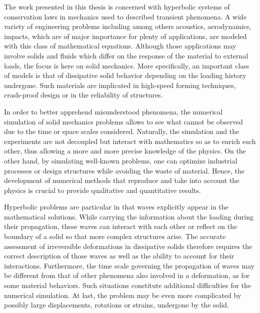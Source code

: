 The work presented in this thesis is concerned with hyperbolic systems of conservation laws in mechanics used to described transient phenomena.
A wide variety of engineering problems including among others acoustics, aerodynamics, impacts, which are of major importance for plenty of applications, are modeled with this class of mathematical equations. 
Although those applications may involve solids and fluids which differ on the response of the material to external loads, the focus is here on solid mechanics.
More specifically, an important class of models is that of dissipative solid behavior depending on the loading history undergone.
Such materials are implicated in high-speed forming techniques, crash-proof design or in the reliability of structures.

In order to better apprehend misunderstood phenomena, the numerical simulation of solid mechanics problems allows to see what cannot be observed due to the time or space scales considered.
Naturally, the simulation and the experiments are not decoupled but interact with mathematics so as to enrich each other, thus allowing a more and more precise knowledge of the physics.
On the other hand, by simulating well-known problems, one can optimize industrial processes or design structures while avoiding the waste of material. 
Hence, the development of numerical methods that reproduce and take into account the physics is crucial to provide qualitative and quantitative results.

Hyperbolic problems are particular in that waves explicitly appear in the mathematical solutions.
While carrying the information about the loading during their propagation, these waves can interact with each other or reflect on the boundary of a solid so that more complex structures arise.
The accurate assessment of irreversible deformations in dissipative solids therefore requires the correct description of those waves as well as the ability to account for their interactions.
Furthermore, the time scale governing the propagation of waves may be different from that of other phenomena also involved in a deformation, as for some material behaviors.
Such situations constitute additional difficulties for the numerical simulation.
At last, the problem may be even more complicated by possibly large displacements, rotations or strains, undergone by the solid.



